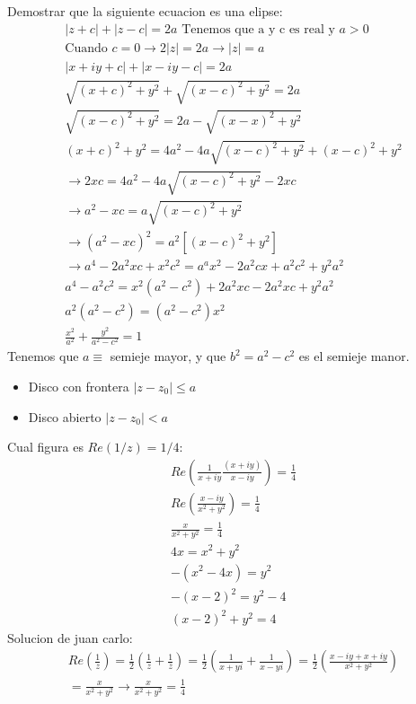\documentclass{article}
\newcommand{\caja}[3]{%
  \begin{tcolorbox}[colback=#1!5!white,colframe=#1!25!black,title=#2]
    #3
  \end{tcolorbox}%
}
\begin{document}
\caja{red}{Curvas en el plano complejo }{
  Demostrar que la siguiente ecuacion es una elipse:
  \begin{gather}
     |z+c|+|z-c| = 2 a \text{   Tenemos que a y c es real y }a>0 \\
     \text{Cuando } c=0 \rightarrow 2|z|= 2a \rightarrow |z|= a\\
     |x+iy+c| +|x-iy-c| = 2a \\
     \sqrt{(x+c)^2 + y^2 } + \sqrt{(x-c)^2 +y^2 } = 2a\\
     \sqrt{(x-c)^2 + y ^ {2 }} = 2a - \sqrt{(x-x) ^ {2 } + y ^ {2 }} \\
     (x+c)^2 + y ^ {2 } = 4 a ^ {2 }- 4a \sqrt{(x-c) ^ {2 } + y ^ {2 }} + (x-c) ^ {2 }+ y ^ {2 }\\
     \rightarrow  2xc = 4a ^ {2 }-4a \sqrt{(x-c ) ^ {2 }+y ^ {2 }}- 2xc\\
     \rightarrow a ^ {2 }-xc  = a \sqrt{(x-c) ^ {2 }+y ^ {2 }} \\
     \rightarrow (a ^ {2 }-xc ) ^ {2 } = a ^ {2 }[(x-c) ^ {2 }+y ^ {2 }]\\
     \rightarrow a^4 -2a ^ {2 }xc+x ^ {2 }c ^ {2 } = a ^ {a }x ^ {2 }-2 a ^ {2 }cx + a ^ {2 }c ^ {2} + y ^ {2 }a ^ {2 }\\
     a ^ {4 }- a ^ {2 }c ^ {2}  = x ^ {2 }(a ^ {2 }-c ^ {2 })+2 a ^ {2 }xc - 2 a ^ {2 }xc + y ^ {2 }a ^ {2 }\\
     a ^ {2 }(a ^ {2 } - c ^ {2 }) = (a ^ {2 }- c ^ {2 })x ^ {2 }\\
     \frac{x ^ {2 }}{a ^ {2 }} + \frac{y ^ {2 }}{a ^ {2 }- c ^ {2 }} = 1   
    \label{eq:ejelipse}
  \end{gather}
  Tenemos que $ a \equiv  $ semieje mayor, y que $ b ^ {2 } =  a ^ {2 }- c ^ {2} $ es el semieje manor. 
}
\caja{green}{Discos }{
  \begin{itemize}
    \item Disco con frontera $ |z-z_0| \leq a  $
    \item Disco abierto $ |z-z_0| < a $
  \end{itemize}
}
\caja{black}{Ejecicio en clase }{
  Cual figura es $ Re(1/z) = 1/4 $:
  \begin{gather}
    Re(\frac{1}{x+iy } \frac{(x+iy)}{x-iy} )= \frac{1}{4}\\
    Re(\frac{x-iy }{x^2+y^2 } ) = \frac{1}{4}\\
    \frac{x }{x ^ {2 }+ y ^ {2 }}= \frac{1}{4}\\
    4x = x^2 +y ^ {2 }\\
    -(x ^ {2 }-4x) = y ^ {2 }\\
    -(x-2)^ {2 } = y ^ {2 }-4 \\
    (x-2)^2+y ^ {2 } = 4 
    \label{eq:solucionej1 }
  \end{gather}
  Solucion de juan carlo: 
  \begin{gather}
    Re(\frac{1}{z } ) = \frac{1}{2}(\frac{1}{z}+ \frac{1}{\bar z}) = \frac{1}{2} (\frac{1}{x+yi } + \frac{1}{x-yi } ) = \frac{1}{2}(\frac{x-iy+x+iy }{x ^ {2 }+ y ^ {2 }} )\\
    = \frac{x}{x^2+y^2 } \rightarrow \frac{x}{x^2+y^2 } = \frac{1}{4}
    \label{eq:soljuancarlos }
  \end{gather}
}
\end{document}
